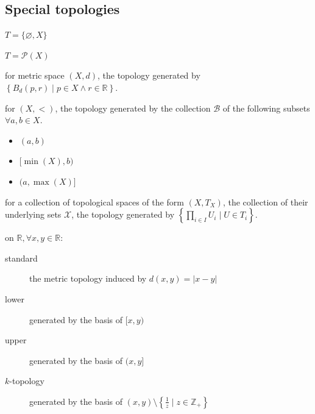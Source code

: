 \documentclass[tbtags,columns=2]{cheatsheet}
\begin{document}
\subsection{Special topologies}
\begin{description}
    \item[trivial] $T=\{\varnothing, X\}$
    \item[discrete] $T=\mathcal{P}(X)$
    \item[metric] for metric space $(X,d)$, the topology generated by $\left\{ B_d(p,r) \mid p \in X \land r \in \mathbb{R} \right\}$.
    \item[order] for $(X,<)$, the topology generated by the collection $\mathcal{B}$ of the following subsets  $\forall a,b \in X$.\begin{itemize}
        \item $(a,b)$
        \item $[\min(X),b)$
        \item $(a,\max(X)]$
    \end{itemize}
    \item[product] for a collection of topological spaces of the form $(X, T_X)$, the collection of their underlying sets $\mathcal{X}$, the topology generated by $\left\{ \prod_{i\in I} U_i \mid U \in T_i \right\}$.
    \item on $\mathbb{R}, \forall x,y \in \mathbb{R}$:
    \begin{description}
        \item[standard] the metric topology induced by $d(x,y)=\left| x - y \right|$
        \item[lower] generated by the basis of $[x,y)$
        \item[upper] generated by the basis of $(x,y]$
        \item[$k$-topology] generated by the basis of $(x,y) \setminus \left\{ \frac{1}{z} \mid z \in \mathbb{Z}_+  \right\}$
    \end{description}
\end{description}
\end{document}
